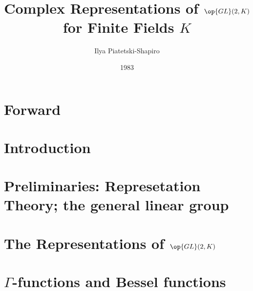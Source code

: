 \documentclass[openany]{book}
\title{Complex Representations of \texorpdfstring{$\op{GL}(2,K)$}{GL(2,K)} for Finite Fields \texorpdfstring{$K$}{K}}
\author{Ilya Piatetski-Shapiro}
\date{1983}
\begin{document}
\maketitle

\toctrue
\tableofcontents
\tocfalse

\newpage

\toctrue
\chapter*{Forward}
\tocfalse



\toctrue
\chapter*{Introduction} 
\tocfalse



\chapter{Preliminaries: Represetation Theory; the general linear group}



\chapter{The Representations of \texorpdfstring{$\op{GL}(2,K)$}{GL2(K)}}



\chapter{\texorpdfstring{$\Gamma$}{Gamma}-functions and Bessel functions}


\end{document}
